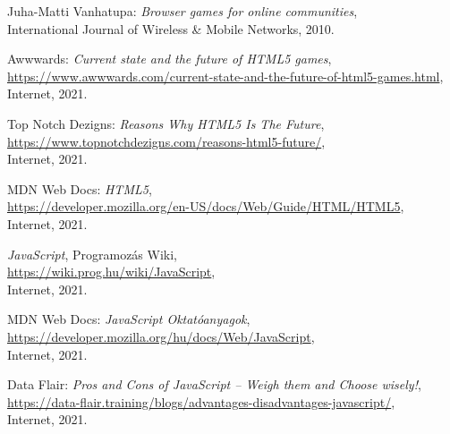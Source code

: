 \begin{thebibliography}{x}
	
	Juha-Matti Vanhatupa: \emph{Browser games for online communities}, \\
	International Journal of Wireless \& Mobile Networks, 2010.
	
	Awwwards: \emph{Current state and the future of HTML5 games}, \\
	\url{https://www.awwwards.com/current-state-and-the-future-of-html5-games.html}, \\
	Internet, 2021.
	
	
	Top Notch Dezigns: \emph{Reasons Why HTML5 Is The Future}, \\
	\url{https://www.topnotchdezigns.com/reasons-html5-future/}, \\
	Internet, 2021.
	
	MDN Web Docs: \emph{HTML5}, \\
	\url{https://developer.mozilla.org/en-US/docs/Web/Guide/HTML/HTML5}, \\
	Internet, 2021.
	
	\emph{JavaScript}, Programozás Wiki, \\
	\url{https://wiki.prog.hu/wiki/JavaScript}, \\
	Internet, 2021.
	
	MDN Web Docs: \emph{JavaScript Oktatóanyagok}, \\
	\url{https://developer.mozilla.org/hu/docs/Web/JavaScript}, \\
	Internet, 2021.
	
	Data Flair: \emph{Pros and Cons of JavaScript – Weigh them and Choose wisely!}, \\
	\url{https://data-flair.training/blogs/advantages-disadvantages-javascript/}, \\
	Internet, 2021.
	

\end{thebibliography}
